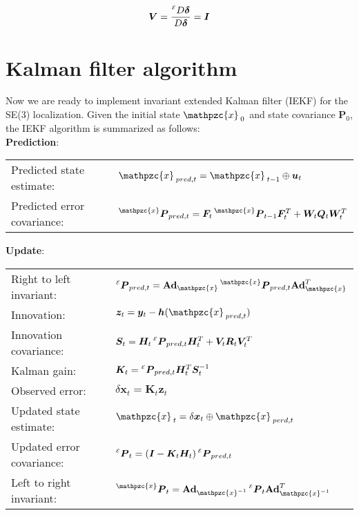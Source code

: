\documentclass[12pt, a4paper]{article}
\begin{document}
\[
  \bm{V}=\frac{\prescript{\scriptscriptstyle\mathcal{E}}{}{D}\bm{\delta}}
  {D \bm{\delta}}=\bm{I}
\]

\section{Kalman filter algorithm}
Now we are ready to implement invariant extended Kalman filter (IEKF) for the
SE(3) localization. Given the initial state $\mathpzc{x}_{\mkern4mu 0}$ and
state covariance $\bm{P}_{0}$, the IEKF algorithm is summarized as follows:\\

\textbf{Prediction}:
\begin{center}
\begin{tabular}{ll}
  Predicted state estimate: & $\mathpzc{x}_{\mkern4mu pred, t}=
  \mathpzc{x}_{\mkern4mu t-1}\oplus\bm{u}_{t}$\\
  Predicted error covariance: & $\prescript{\mathpzc{x}}{}{\bm{P}}_{pred, t}=
  \bm{F}_{t}\prescript{\mathpzc{x}}{}{\bm{P}}_{t-1}\bm{F}_{t}^{T}+
  \bm{W}_{t}\bm{Q}_{t}\bm{W}_{t}^{T}$
\end{tabular}
\end{center}

\textbf{Update}:
\begin{center}
\begin{tabular}{ll}
  Right to left invariant: &
  $\prescript{\scriptscriptstyle\mathcal{E}}{}{\bm{P}}_{pred, t}=
  \textbf{Ad}_{\mathpzc{x}}\prescript{\mathpzc{x}}{}{\bm{P}}_{pred, t}
  \textbf{Ad}_{\mathpzc{x}}^{T}$\\
  Innovation: & $\bm{z}_{t}=\bm{y}_{t}-\bm{h}(\mathpzc{x}_{\mkern4mu pred,t})$\\
  Innovation covariance: & $\bm{S}_{t}=
  \bm{H}_{t}\prescript{\scriptscriptstyle\mathcal{E}}{}{\bm{P}}_{pred,t}
  \bm{H}_{t}^{T}+\bm{V}_{t}\bm{R}_{t}\bm{V}_{t}^{T}$\\
  Kalman gain: & $\bm{K}_{t}=
  \prescript{\scriptscriptstyle\mathcal{E}}{}{\bm{P}}_{pred,t}
  \bm{H}_{t}^{T}\bm{S}_{t}^{-1}$\\
  Observed error: & $\delta \bm{x}_{t}=\bm{K}_{t}\bm{z}_{t}$\\
  Updated state estimate: & $\mathpzc{x}_{\mkern4mu t} = \delta \bm{x}_{t}\oplus
  \mathpzc{x}_{\mkern4mu perd,t}$\\
  Updated error covariance: &
  $\prescript{\scriptscriptstyle\mathcal{E}}{}{\bm{P}}_{t}=
  (\bm{I}-\bm{K}_{t}\bm{H}_{t})
  \prescript{\scriptscriptstyle\mathcal{E}}{}{\bm{P}}_{pred,t}$\\
  Left to right invariant: &
  $\prescript{\mathpzc{x}}{}{\bm{P}}_{t}=
  \textbf{Ad}_{\mathpzc{x}^{-1}}
  \prescript{\scriptscriptstyle\mathcal{E}}{}{\bm{P}}_{t}
  \textbf{Ad}_{\mathpzc{x}^{-1}}^{T}$\\
\end{tabular}
\end{center}
\end{document}
